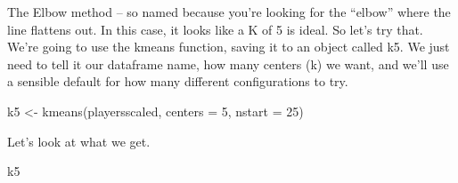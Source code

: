 \documentclass[
]{book}
\newenvironment{Shaded}{\begin{snugshade}}{\end{snugshade}}
\newcommand{\AttributeTok}[1]{\textcolor[rgb]{0.77,0.63,0.00}{#1}}
\newcommand{\DecValTok}[1]{\textcolor[rgb]{0.00,0.00,0.81}{#1}}
\newcommand{\FunctionTok}[1]{\textcolor[rgb]{0.00,0.00,0.00}{#1}}
\newcommand{\NormalTok}[1]{#1}
\newcommand{\OtherTok}[1]{\textcolor[rgb]{0.56,0.35,0.01}{#1}}
\begin{document}
The Elbow method -- so named because you're looking for the ``elbow'' where the line flattens out. In this case, it looks like a K of 5 is ideal. So let's try that. We're going to use the kmeans function, saving it to an object called k5. We just need to tell it our dataframe name, how many centers (k) we want, and we'll use a sensible default for how many different configurations to try.

\begin{Shaded}
\begin{Highlighting}[]
\NormalTok{k5 }\OtherTok{\textless{}{-}} \FunctionTok{kmeans}\NormalTok{(playersscaled, }\AttributeTok{centers =} \DecValTok{5}\NormalTok{, }\AttributeTok{nstart =} \DecValTok{25}\NormalTok{)}
\end{Highlighting}
\end{Shaded}

Let's look at what we get.

\begin{Shaded}
\begin{Highlighting}[]
\NormalTok{k5}
\end{Highlighting}
\end{Shaded}
\end{document}

